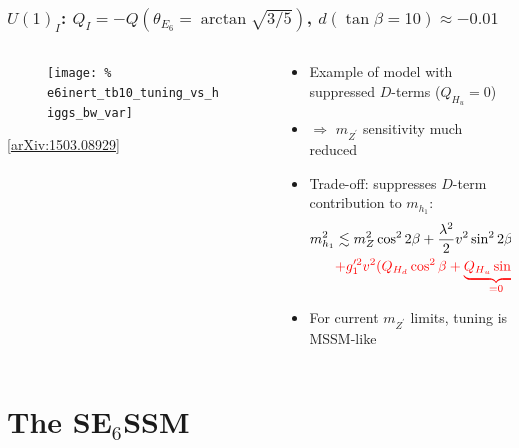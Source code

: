 \documentclass[10pt,aspectratio=169]{beamer}
\begin{document}
\begin{frame}
  \frametitle{$U(1)_I$: $Q_I = -Q(\theta_{E_6} = \arctan\sqrt{3/5})$,
    $d(\tan\beta = 10) \approx -0.01$}
  \begin{columns}
    \begin{column}{0.5\textwidth}
      \vspace*{-15pt}
      \begin{figure}
        \texttt{[image: \%
          e6inert\_tb10\_tuning\_vs\_higgs\_bw\_var]}
      \end{figure}
      \begin{center}
        \tiny [\href{https://arxiv.org/abs/1503.08929}{arXiv:1503.08929}]
      \end{center}
    \end{column}
    \begin{column}{0.5\textwidth}
      \begin{itemize} \itemsep1.5em
        \item Example of model with suppressed $D$-terms
          ($Q_{H_u} = 0$)
        \item {\color{blue} $\Rightarrow$ $m_{Z^\prime}$ sensitivity much
          reduced}
        \item \alert{Trade-off: suppresses $D$-term contribution to
          $m_{h_1}$:}
          \begin{align*}
            m_{h_1}^2 &\lesssim m_Z^2 \cos^2 2\beta + \frac{\lambda^2}{2} v^2
              \sin^2 2\beta \\
              &{} {\color{red} + g_1'^2 v^2 ( Q_{H_d} \cos^2\beta +
            \underbrace{Q_{H_u} \sin^2\beta}_{=0} )^2}
          \end{align*}
        \item For current $m_{Z^\prime}$ limits, tuning is MSSM-like
      \end{itemize}
    \end{column}
  \end{columns}
\end{frame}

\section{The SE$_6$SSM}
\end{document}
